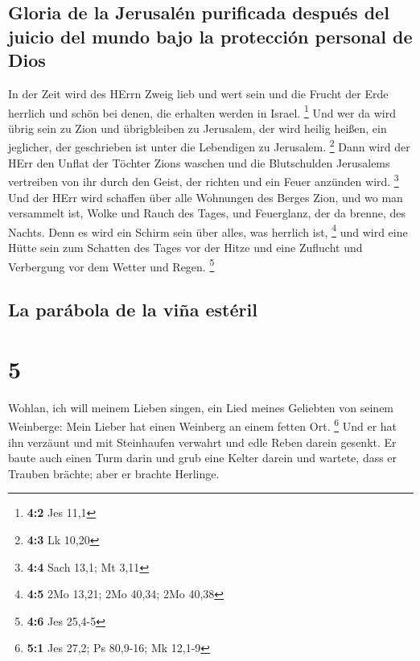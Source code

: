 \hypertarget{gloria-de-la-jerusaluxe9n-purificada-despuuxe9s-del-juicio-del-mundo-bajo-la-protecciuxf3n-personal-de-dios}{%
\subsection{Gloria de la Jerusalén purificada después del juicio del
mundo bajo la protección personal de
Dios}\label{gloria-de-la-jerusaluxe9n-purificada-despuuxe9s-del-juicio-del-mundo-bajo-la-protecciuxf3n-personal-de-dios}}

 In der Zeit wird des HErrn Zweig lieb und wert sein und
die Frucht der Erde herrlich und schön bei denen, die erhalten werden in
Israel. \footnote{\textbf{4:2} Jes 11,1}  Und wer da wird
übrig sein zu Zion und übrigbleiben zu Jerusalem, der wird heilig
heißen, ein jeglicher, der geschrieben ist unter die Lebendigen zu
Jerusalem. \footnote{\textbf{4:3} Lk 10,20}  Dann wird der
HErr den Unflat der Töchter Zions waschen und die Blutschulden
Jerusalems vertreiben von ihr durch den Geist, der richten und ein Feuer
anzünden wird. \footnote{\textbf{4:4} Sach 13,1; Mt 3,11} 
Und der HErr wird schaffen über alle Wohnungen des Berges Zion, und wo
man versammelt ist, Wolke und Rauch des Tages, und Feuerglanz, der da
brenne, des Nachts. Denn es wird ein Schirm sein über alles, was
herrlich ist, \footnote{\textbf{4:5} 2Mo 13,21; 2Mo 40,34; 2Mo 40,38}
 und wird eine Hütte sein zum Schatten des Tages vor der
Hitze und eine Zuflucht und Verbergung vor dem Wetter und Regen.
\footnote{\textbf{4:6} Jes 25,4-5}

\hypertarget{la-paruxe1bola-de-la-viuxf1a-estuxe9ril}{%
\subsection{La parábola de la viña
estéril}\label{la-paruxe1bola-de-la-viuxf1a-estuxe9ril}}

\hypertarget{section-4}{%
\section{5}\label{section-4}}

 Wohlan, ich will meinem Lieben singen, ein Lied meines
Geliebten von seinem Weinberge: Mein Lieber hat einen Weinberg an einem
fetten Ort. \footnote{\textbf{5:1} Jes 27,2; Ps 80,9-16; Mk 12,1-9}
 Und er hat ihn verzäunt und mit Steinhaufen verwahrt und
edle Reben darein gesenkt. Er baute auch einen Turm darin und grub eine
Kelter darein und wartete, dass er Trauben brächte; aber er brachte
Herlinge.

